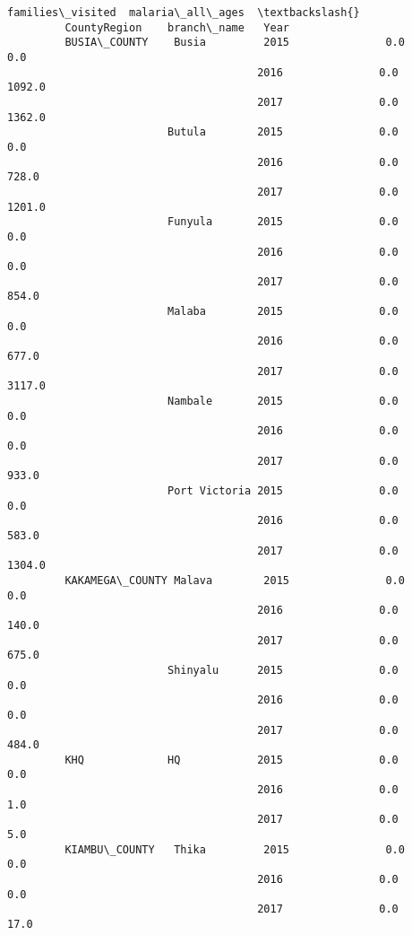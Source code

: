 \documentclass[11pt]{article}
\begin{document}
\begin{Verbatim}[commandchars=\\\{\}]
                                             families\_visited  malaria\_all\_ages  \textbackslash{}
         CountyRegion    branch\_name   Year                                       
         BUSIA\_COUNTY    Busia         2015               0.0               0.0   
                                       2016               0.0            1092.0   
                                       2017               0.0            1362.0   
                         Butula        2015               0.0               0.0   
                                       2016               0.0             728.0   
                                       2017               0.0            1201.0   
                         Funyula       2015               0.0               0.0   
                                       2016               0.0               0.0   
                                       2017               0.0             854.0   
                         Malaba        2015               0.0               0.0   
                                       2016               0.0             677.0   
                                       2017               0.0            3117.0   
                         Nambale       2015               0.0               0.0   
                                       2016               0.0               0.0   
                                       2017               0.0             933.0   
                         Port Victoria 2015               0.0               0.0   
                                       2016               0.0             583.0   
                                       2017               0.0            1304.0   
         KAKAMEGA\_COUNTY Malava        2015               0.0               0.0   
                                       2016               0.0             140.0   
                                       2017               0.0             675.0   
                         Shinyalu      2015               0.0               0.0   
                                       2016               0.0               0.0   
                                       2017               0.0             484.0   
         KHQ             HQ            2015               0.0               0.0   
                                       2016               0.0               1.0   
                                       2017               0.0               5.0   
         KIAMBU\_COUNTY   Thika         2015               0.0               0.0   
                                       2016               0.0               0.0   
                                       2017               0.0              17.0   

\end{Verbatim}
\end{document}
